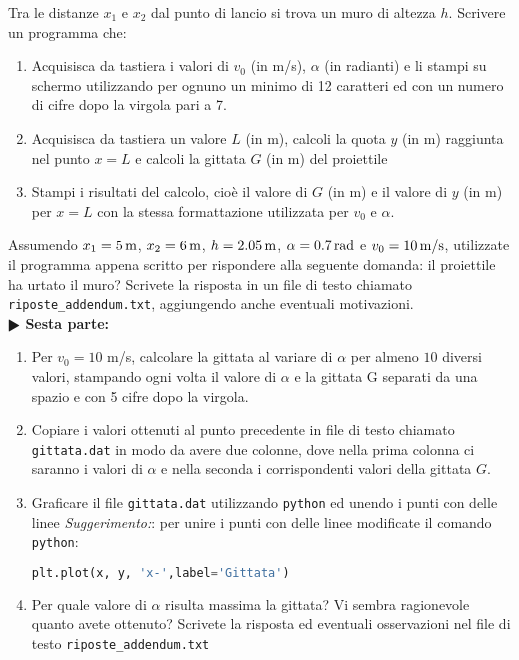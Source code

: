 \documentclass[11pt]{article}
\begin{document}
Tra le distanze $x_1$ e $x_2$ dal punto di lancio si trova un muro di altezza $h$.
Scrivere un programma che:
\begin{enumerate}
  \item Acquisisca da tastiera i valori di $v_0$ (in m/s), $\alpha$ (in radianti) e li stampi su schermo utilizzando per ognuno un minimo di 12 caratteri ed con un numero di cifre dopo la virgola pari a 7. 
  \item Acquisisca da tastiera un valore $L$ (in m), calcoli la quota $y$ (in m) raggiunta nel punto $x = L$ e
    calcoli la gittata $G$ (in m) del proiettile
  \item Stampi i risultati del calcolo, cioè il valore di $G$ (in m) e il valore di $y$ (in m) per $x=L$ 
        con la stessa formattazione utilizzata per $v_0$ e $\alpha$.
\end{enumerate}
Assumendo $x_1=5\,\hbox{m}$, $x_2=6\,\hbox{m}$, $h=2.05\,\hbox{m}$, $\alpha=0.7\,\hbox{rad}$ e $v_0=10\,\hbox{m/s}$,
utilizzate il programma appena scritto per rispondere alla seguente domanda: il proiettile ha urtato il muro? 
Scrivete la risposta in un file di testo chiamato \texttt{riposte\_addendum.txt}, aggiungendo anche eventuali motivazioni.
\vspace{3mm} \\
\textbf{$\RHD$ Sesta parte:} 
\begin{enumerate}
  \item Per $v_0=10$ m/s, calcolare la gittata al variare di $\alpha$ per almeno $10$ diversi valori, stampando 
   ogni volta il valore di $\alpha$ e la gittata G separati da una spazio e con 5 cifre dopo la virgola.
  
 \item Copiare i valori ottenuti al punto precedente in file di testo chiamato \texttt{gittata.dat} 
     in modo da avere due colonne, dove nella prima colonna ci saranno i valori di $\alpha$ 
      e nella seconda i corrispondenti valori della gittata $G$.

    \item Graficare il file \texttt{gittata.dat} utilizzando \texttt{python} ed unendo i punti con delle linee
    {\em Suggerimento:\/}: per unire i punti con delle linee modificate il comando \texttt{python}:
    \vspace{0.2cm}
\begin{lstlisting}[language=Python,numbers=none]
  plt.plot(x, y, 'x-',label='Gittata')
\end{lstlisting}
 \item Per quale valore di $\alpha$ risulta massima la gittata? Vi sembra ragionevole quanto avete ottenuto?
      Scrivete la risposta ed eventuali osservazioni nel file di testo \texttt{riposte\_addendum.txt}
\end{enumerate}  
\end{document}
